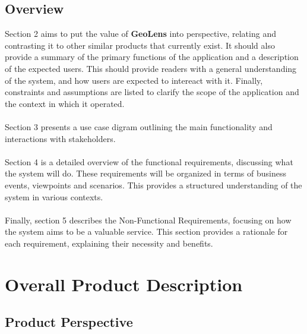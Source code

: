 \documentclass[]{article}
\begin{document}
\subsection{Overview}
\label{sub:overview}
Section 2 aims to put the value of \textbf{GeoLens} into perspective, relating and contrasting it to other similar products that currently exist.
It should also provide a summary of the primary functions of the application and a description of the expected users. This should provide readers with a general understanding
of the system, and how users are expected to intereact with it. Finally, constraints and assumptions are listed to clarify the scope of the application and the context in which it operated.\\\\
Section 3 presents a use case digram outlining the main functionality and interactions with stakeholders.\\\\
Section 4 is a detailed overview of the functional requirements, discussing what the system will do. These requirements will be organized in terms of 
business events, viewpoints and scenarios. This provides a structured understanding of the system in various contexts. \\\\
Finally, section 5 describes the Non-Functional Requirements, focusing on how the system aims to be a valuable service. This section provides a rationale for each requirement, explaining their necessity and benefits.


\section{Overall Product Description}
\label{sec:overall_description}



\subsection{Product Perspective}
\label{sub:product_perspective}
\end{document}
